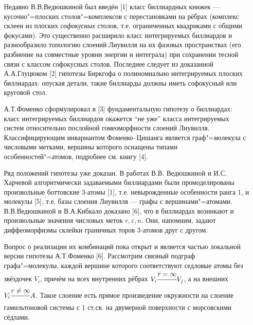 
\vzmscaption

Недавно В.В.Ведюшкиной был введён [1] класс биллиардных книжек --- кусочно"=плоских столов"=комплексов с перестановками на рёбрах (комплекс склеен из плоских \textit{софокусных} столов, т.е. ограниченных квадриками с общими фокусами). Это существенно расширило класс интегрируемых биллиардов и разнообразило топологию слоений Лиувилля на их фазовых пространствах (его разбиение на совместные уровни энергии и интеграла) при сохранении тесной связи с классом софокусных столов. Последнее следует из доказанной А.А.Глуцюком [2] гипотезы Биркгофа о полиномиально интегрируемых плоских биллиардах: опуская детали, такие биллиарды должны иметь  софокусный или круговой стол.

А.Т.Фоменко сформулировал в [3] фундаментальную гипотезу о биллиардах:  класс интегрируемых биллиардов окажется ``не уже'' класса интегрируемых систем относительно послойной гомеоморфности слоений Лиувилля. Классифицирующим инвариантом Фоменко--Цишанга является граф"=молекула с числовыми метками, вершины которого оснащены типами особенностей"=атомов, подробнее см. книгу [4].

Ряд положений гипотезы уже доказан. В работах В.В. Ведюшкиной и И.С. Харчевой алгоритмически задаваемыми биллиардами были промоделированы произвольные боттовские 3-атомы [1], т.е. невырожденные особенности ранга 1, и молекулы [5], т.е. базы слоения Лиувилля --- графы с вершинами"=атомами. В.В.Ведюшкиной и В.А.Кибкало доказано [6], что в биллиардах возникают и произвольные значения числовых меток $r, \varepsilon, n$. Они, напомним, задают диффеоморфизмы склейки граничных торов 3-атомов друг с другом.

Вопрос о реализации их комбинаций пока открыт и является частью локальной версии гипотезы А.Т.Фоменко [6]. Рассмотрим связный подграф графа"=молекулы, каждой вершине которого соответствуют седловые атомы без звёздочек $V_i$, причём на всех внутренних рёбрах $V_i \cfrac{r = \infty}{}V_j$, а на внешних $V_i \cfrac{r \ne \infty}{}A$. Такое слоение есть прямое произведение окружности на слоение гамильтоновой системы с 1 ст.св. на двумерной поверхности с морсовскими сёдлами.

